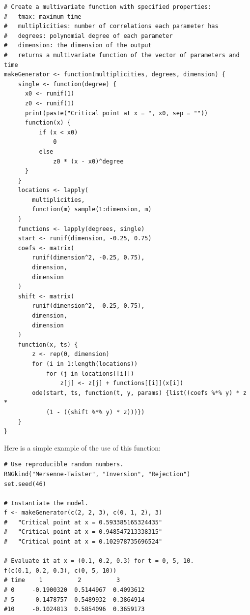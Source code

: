 \documentclass[12pt]{article}
\begin{document}
\begin{small}
\begin{verbatim}
# Create a multivariate function with specified properties:
#   tmax: maximum time
#   multiplicities: number of correlations each parameter has
#   degrees: polynomial degree of each parameter
#   dimension: the dimension of the output
#   returns a multivariate function of the vector of parameters and time
makeGenerator <- function(multiplicities, degrees, dimension) {
    single <- function(degree) {
      x0 <- runif(1)
      z0 <- runif(1)
      print(paste("Critical point at x = ", x0, sep = ""))
      function(x) {
          if (x < x0)
              0
          else
              z0 * (x - x0)^degree
      }
    }
    locations <- lapply(
        multiplicities,
        function(m) sample(1:dimension, m)
    )
    functions <- lapply(degrees, single)
    start <- runif(dimension, -0.25, 0.75)
    coefs <- matrix(
        runif(dimension^2, -0.25, 0.75),
        dimension,
        dimension
    )    
    shift <- matrix(
        runif(dimension^2, -0.25, 0.75),
        dimension,
        dimension
    )
    function(x, ts) {
        z <- rep(0, dimension)
        for (i in 1:length(locations))
            for (j in locations[[i]])
                z[j] <- z[j] + functions[[i]](x[i])
        ode(start, ts, function(t, y, params) {list((coefs %*% y) * z *
            (1 - ((shift %*% y) * z)))})
    }
}
\end{verbatim}
\end{small}

Here is a simple example of the use of this function:
\begin{small}
\begin{verbatim}
# Use reproducible random numbers.
RNGkind("Mersenne-Twister", "Inversion", "Rejection")
set.seed(46)

# Instantiate the model.
f <- makeGenerator(c(2, 2, 3), c(0, 1, 2), 3)
#   "Critical point at x = 0.593385165324435"
#   "Critical point at x = 0.948547213338315"
#   "Critical point at x = 0.102978735696524"

# Evaluate it at x = (0.1, 0.2, 0.3) for t = 0, 5, 10.
f(c(0.1, 0.2, 0.3), c(0, 5, 10))
# time    1          2          3
# 0     -0.1900320  0.5144967  0.4093612
# 5     -0.1478757  0.5489932  0.3864914
#10     -0.1024813  0.5854096  0.3659173
\end{verbatim}
\end{small}
\end{document}
